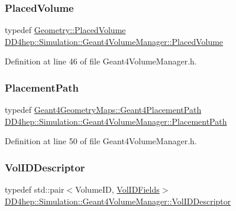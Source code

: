 \subsubsection{\texorpdfstring{Placed\+Volume}{PlacedVolume}}
{\footnotesize\ttfamily typedef \hyperlink{class_d_d4hep_1_1_geometry_1_1_placed_volume}{Geometry\+::\+Placed\+Volume} \hyperlink{class_d_d4hep_1_1_simulation_1_1_geant4_volume_manager_a5303c9cd0941b91ab010074947517bd6}{D\+D4hep\+::\+Simulation\+::\+Geant4\+Volume\+Manager\+::\+Placed\+Volume}}



Definition at line 46 of file Geant4\+Volume\+Manager.\+h.

\hypertarget{class_d_d4hep_1_1_simulation_1_1_geant4_volume_manager_a990d8577e764541c4914263db1c6b0ca}{}\label{class_d_d4hep_1_1_simulation_1_1_geant4_volume_manager_a990d8577e764541c4914263db1c6b0ca} 
\subsubsection{\texorpdfstring{Placement\+Path}{PlacementPath}}
{\footnotesize\ttfamily typedef \hyperlink{namespace_d_d4hep_1_1_simulation_1_1_geant4_geometry_maps_a8a325934adb143cb1cbc47dd030395ed}{Geant4\+Geometry\+Maps\+::\+Geant4\+Placement\+Path} \hyperlink{class_d_d4hep_1_1_simulation_1_1_geant4_volume_manager_a990d8577e764541c4914263db1c6b0ca}{D\+D4hep\+::\+Simulation\+::\+Geant4\+Volume\+Manager\+::\+Placement\+Path}}



Definition at line 50 of file Geant4\+Volume\+Manager.\+h.

\hypertarget{class_d_d4hep_1_1_simulation_1_1_geant4_volume_manager_aeedd11a516f671331ec2a46f5d39768d}{}\label{class_d_d4hep_1_1_simulation_1_1_geant4_volume_manager_aeedd11a516f671331ec2a46f5d39768d} 
\subsubsection{\texorpdfstring{Vol\+I\+D\+Descriptor}{VolIDDescriptor}}
{\footnotesize\ttfamily typedef std\+::pair$<$Volume\+ID, \hyperlink{class_d_d4hep_1_1_simulation_1_1_geant4_volume_manager_ae80cafd25a138d7c91c24cda4bc350b1}{Vol\+I\+D\+Fields}$>$ \hyperlink{class_d_d4hep_1_1_simulation_1_1_geant4_volume_manager_aeedd11a516f671331ec2a46f5d39768d}{D\+D4hep\+::\+Simulation\+::\+Geant4\+Volume\+Manager\+::\+Vol\+I\+D\+Descriptor}}



